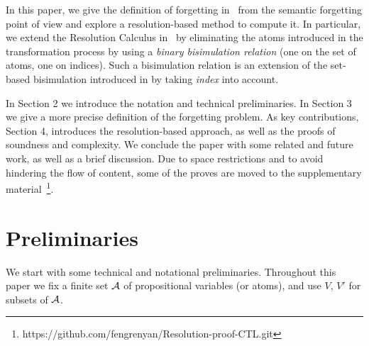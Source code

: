 \documentclass{article}
\begin{document}
In this paper, we give the definition of forgetting in \CTL\ from the semantic forgetting point of view and explore a resolution-based method to compute it. In particular, we extend the Resolution Calculus in~\cite{zhang2014resolution} by eliminating the atoms introduced in the transformation process %
by using a \emph{binary bisimulation relation} (one on the set of atoms, one on indices).
Such a bisimulation relation is an extension of the set-based bisimulation introduced in \cite{renyansfirstpaper} by taking \emph{index} into account.

In Section 2 we introduce the notation and technical preliminaries.
In Section 3 we give a more precise definition of the forgetting problem.
As key contributions, Section 4, introduces the resolution-based approach, as well as the proofs of soundness and complexity.
We conclude the paper with some related and future work, as well as a brief discussion. Due to space restrictions and to avoid hindering the flow of content, some of the proves are moved to the supplementary material~\footnote{https://github.com/fengrenyan/Resolution-proof-CTL.git}.
%
%
\section{Preliminaries}
We start with some technical and notational preliminaries. Throughout this paper we fix a finite set ${\cal A}$ of propositional variables (or atoms), and use $V$, $V'$ for subsets of ${\cal A}$.
\end{document}
